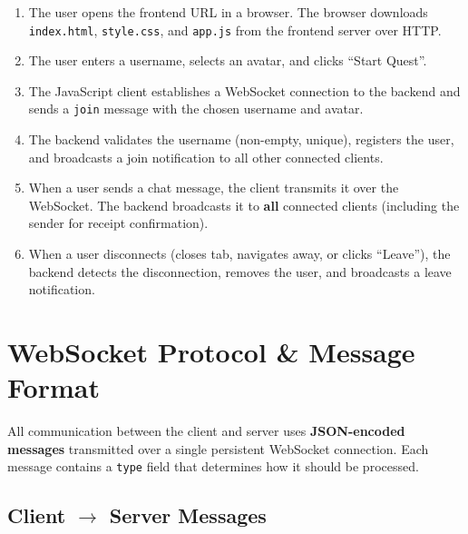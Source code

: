 \documentclass[12pt, a4paper]{article}
\begin{document}
\begin{enumerate}[leftmargin=*]
    \item The user opens the frontend URL in a browser. The browser downloads \texttt{index.html}, \texttt{style.css}, and \texttt{app.js} from the frontend server over HTTP.
    \item The user enters a username, selects an avatar, and clicks ``Start Quest''.
    \item The JavaScript client establishes a WebSocket connection to the backend and sends a \texttt{join} message with the chosen username and avatar.
    \item The backend validates the username (non-empty, unique), registers the user, and broadcasts a join notification to all other connected clients.
    \item When a user sends a chat message, the client transmits it over the WebSocket. The backend broadcasts it to \textbf{all} connected clients (including the sender for receipt confirmation).
    \item When a user disconnects (closes tab, navigates away, or clicks ``Leave''), the backend detects the disconnection, removes the user, and broadcasts a leave notification.
\end{enumerate}


\section{WebSocket Protocol \& Message Format}

All communication between the client and server uses \textbf{JSON-encoded messages} transmitted over a single persistent WebSocket connection. Each message contains a \texttt{type} field that determines how it should be processed.

\subsection{Client $\rightarrow$ Server Messages}
\end{document}
